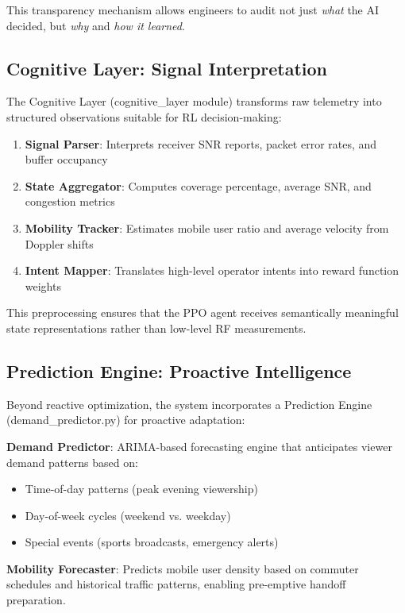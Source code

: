 \documentclass[conference]{IEEEtran}
\begin{document}
This transparency mechanism allows engineers to audit not just \textit{what} the AI decided, but \textit{why} and \textit{how it learned}.

\subsection{Cognitive Layer: Signal Interpretation}

The Cognitive Layer (cognitive\_layer module) transforms raw telemetry into structured observations suitable for RL decision-making:

\begin{enumerate}
\item \textbf{Signal Parser}: Interprets receiver SNR reports, packet error rates, and buffer occupancy
\item \textbf{State Aggregator}: Computes coverage percentage, average SNR, and congestion metrics
\item \textbf{Mobility Tracker}: Estimates mobile user ratio and average velocity from Doppler shifts
\item \textbf{Intent Mapper}: Translates high-level operator intents into reward function weights
\end{enumerate}

This preprocessing ensures that the PPO agent receives semantically meaningful state representations rather than low-level RF measurements.

\subsection{Prediction Engine: Proactive Intelligence}

Beyond reactive optimization, the system incorporates a Prediction Engine (demand\_predictor.py) for proactive adaptation:

\textbf{Demand Predictor}: ARIMA-based forecasting engine that anticipates viewer demand patterns based on:
\begin{itemize}
\item Time-of-day patterns (peak evening viewership)
\item Day-of-week cycles (weekend vs. weekday)
\item Special events (sports broadcasts, emergency alerts)
\end{itemize}

\textbf{Mobility Forecaster}: Predicts mobile user density based on commuter schedules and historical traffic patterns, enabling pre-emptive handoff preparation.
\end{document}
